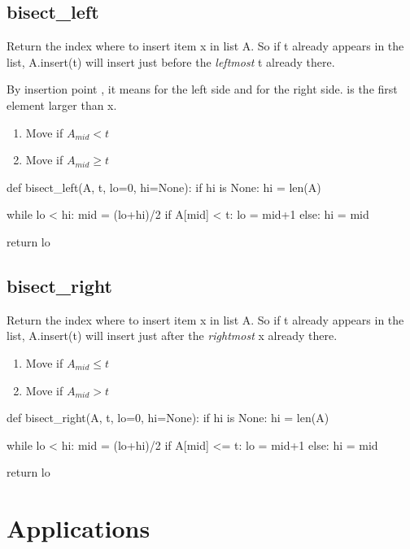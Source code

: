 \subsection{bisect\_left}
Return the index where to insert item x in list A. So if t already appears in the list,
A.insert(t) will insert just before the \textit{leftmost} t already there.

By insertion point , it means  for the left side and  for the right side.  is the first element larger than x. 
\begin{enumerate}
\item Move  if $A_{mid} < t$
\item Move  if $A_{mid} \geq t$
\end{enumerate}

\begin{python}
def bisect_left(A, t, lo=0, hi=None):
    if hi is None: hi = len(A)

    while lo < hi:
        mid = (lo+hi)/2
        if A[mid] < t: lo = mid+1   
        else:          hi = mid

    return lo
\end{python}

\subsection{bisect\_right}
Return the index where to insert item x in list A. So if t already appears in the list, A.insert(t) will insert just after the \textit{rightmost} x already there.
\begin{enumerate}
\item Move  if $A_{mid} \leq t$
\item Move  if $A_{mid} > t$
\end{enumerate}
\begin{python}
def bisect_right(A, t, lo=0, hi=None):
    if hi is None: hi = len(A)

    while lo < hi:
        mid = (lo+hi)/2
        if A[mid] <= t: lo = mid+1
        else:           hi = mid 

    return lo
\end{python}
\section{Applications}
